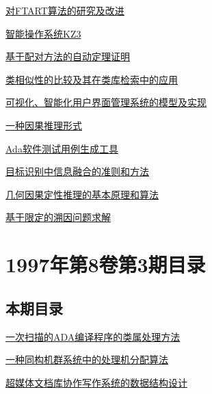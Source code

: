 \documentclass[a4paper]{article}
\begin{document}
\href{http://www.jos.org.cn/ch/reader/download_pdf.aspx?file_no=19970403&year_id=1997&quarter_id=4&falg=1}{对FTART算法的研究及改进}

\href{http://www.jos.org.cn/ch/reader/download_pdf.aspx?file_no=19970404&year_id=1997&quarter_id=4&falg=1}{智能操作系统KZ3}

\href{http://www.jos.org.cn/ch/reader/download_pdf.aspx?file_no=19970405&year_id=1997&quarter_id=4&falg=1}{基于配对方法的自动定理证明}

\href{http://www.jos.org.cn/ch/reader/download_pdf.aspx?file_no=19970406&year_id=1997&quarter_id=4&falg=1}{类相似性的比较及其在类库检索中的应用}

\href{http://www.jos.org.cn/ch/reader/download_pdf.aspx?file_no=19970407&year_id=1997&quarter_id=4&falg=1}{可视化、智能化用户界面管理系统的模型及实现}

\href{http://www.jos.org.cn/ch/reader/download_pdf.aspx?file_no=19970408&year_id=1997&quarter_id=4&falg=1}{一种因果推理形式}

\href{http://www.jos.org.cn/ch/reader/download_pdf.aspx?file_no=19970409&year_id=1997&quarter_id=4&falg=1}{Ada软件测试用例生成工具}

\href{http://www.jos.org.cn/ch/reader/download_pdf.aspx?file_no=19970410&year_id=1997&quarter_id=4&falg=1}{目标识别中信息融合的准则和方法}

\href{http://www.jos.org.cn/ch/reader/download_pdf.aspx?file_no=19970411&year_id=1997&quarter_id=4&falg=1}{几何因果定性推理的基本原理和算法}

\href{http://www.jos.org.cn/ch/reader/download_pdf.aspx?file_no=19970412&year_id=1997&quarter_id=4&falg=1}{基于限定的溯因问题求解}


\section{\textbf{1997年第8卷第3期目录}}
\subsection{本期目录}
\href{http://www.jos.org.cn/ch/reader/download_pdf.aspx?file_no=19970311&year_id=1997&quarter_id=3&falg=1}{一次扫描的ADA编译程序的类属处理方法}

\href{http://www.jos.org.cn/ch/reader/download_pdf.aspx?file_no=19970301&year_id=1997&quarter_id=3&falg=1}{一种同构机群系统中的处理机分配算法}

\href{http://www.jos.org.cn/ch/reader/download_pdf.aspx?file_no=19970302&year_id=1997&quarter_id=3&falg=1}{超媒体文档库协作写作系统的数据结构设计}
\end{document}
